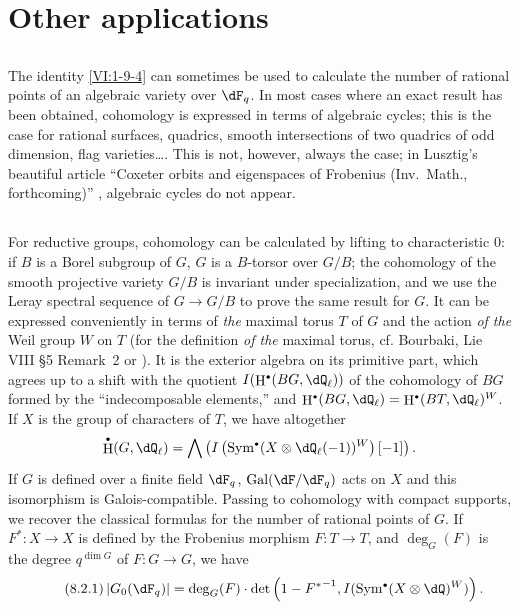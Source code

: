 \documentclass[oneside]{book}
\DeclareMathOperator{\gal}{Gal}
\DeclareMathOperator{\h}{H}
\newcounter{char}
\theoremstyle{sga-source}
\theoremstyle{sga-source-dash}
\theoremstyle{sga-source-dotdash}
\theoremstyle{sga-source-number-note-dash}
\theoremstyle{sga-source-note-number-dotdash}
\theoremstyle{sga-source-example-dotdash}
\theoremstyle{sga-source-inline-number}
\theoremstyle{sga-source-bare-number}
\theoremstyle{sga-source}
\let\oldbullet\bullet
\renewcommand{\bullet}{\textnormal{\tiny$\oldbullet$}}
\newcommand{\PrintPage}[1]{}\newcommand{\MathPage}[1]{}\newcommand{\PrintCite}[2]{#1}\newcommand{\var}[3]{#1}
\begin{document}
\PrintPage{230}
\section{Other applications}\label{VI:8}





\subsection{}\label{VI:8-1}

The identity \ref{VI:1-9-4} can sometimes be used to calculate 
the number of rational points of an algebraic variety over $\dF_q$. In 
most cases where an exact result has been obtained, cohomology 
is expressed in terms of algebraic cycles; this is the case for rational 
surfaces, quadrics, smooth intersections of two quadrics of 
odd dimension, flag varieties\ldots. This is not, however, 
always the case; in Lusztig's beautiful article ``Coxeter orbits and eigenspaces of Frobenius (Inv.~Math., forthcoming)'' \cite{lu76}, algebraic cycles 
do not appear. 





\subsection{}\label{VI:8-2}

For reductive groups, cohomology can be calculated by lifting to 
characteristic $0$: if $B$ is a Borel subgroup of $G$, $G$ is a 
$B$-torsor over $G/B$; the cohomology of the smooth projective variety 
$G/B$ is invariant under specialization, and we use the Leray spectral sequence 
of $G\to G/B$ to prove the same result for $G$. It can be expressed 
conveniently in terms of \emph{the} maximal torus $T$ of $G$ and the action 
\emph{of the} \var{Weil group $W$}{Weyl group $W$}{S45-SOL-0978} on $T$ (for the definition \emph{of the} maximal 
torus, cf. Bourbaki, Lie VIII \S 5 Remark~2 \cite[VIII \S 5 Rem.2]{bo05} or \cite[p.105]{dl76}). It is 
the exterior algebra on its primitive part, which agrees up to a shift 
with the quotient $I(\h^\bullet(B G,\dQ_\ell))$ of the cohomology of 
$B G$ formed by the ``indecomposable elements,'' and 
$\h^\bullet(B G,\dQ_\ell)=\h^\bullet(B T,\dQ_\ell)^W$. If $X$ is the group of 
characters of $T$, we have altogether 
\[
  \h^\bullet(G,\dQ_\ell) = \bigwedge \left(I\left(\operatorname{Sym}^\bullet(X\otimes \dQ_\ell(-1))^W\right)[-1]\right) \text{.}
\]
If $G$ is defined over a finite field $\dF_q$, $\gal(\dF/\dF_q)$ acts on $X$ 
and this isomorphism is Galois-compatible. Passing to 
cohomology with compact supports, we recover the classical formulas for the 
number of rational points of $G$. If $F^\ast:X\to X$ is defined by the 
Frobenius morphism $F:T\to T$, and $\deg_G(F)$ is the degree 
$q^{\dim G}$ of $F:G\to G$, we have 
\begin{equation*}\tag{8.2.1}\label{VI:eq:8-2-1}
  \left|G_0(\dF_q)\right| = \deg_G(F) \cdot \det\left(1-{F^\ast}^{-1},I(\operatorname{Sym}^\bullet(X\otimes \dQ)^W)\right) \text{.}
\end{equation*}
\end{document}
